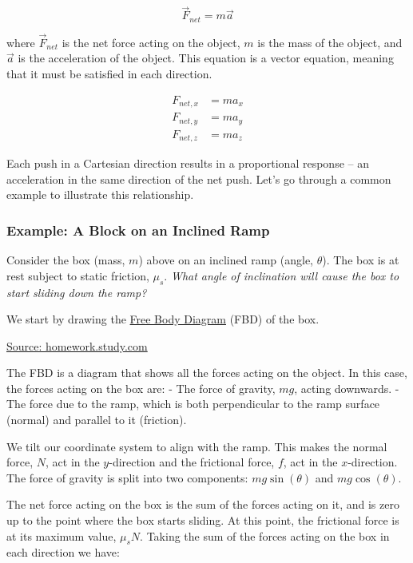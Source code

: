 \[\vec{F}_{net} = m\vec{a}\]

where \(\vec{F}_{net}\) is the net force acting on the object, \(m\) is
the mass of the object, and \(\vec{a}\) is the acceleration of the
object. This equation is a vector equation, meaning that it must be
satisfied in each direction.

\[\begin{aligned}
F_{net,x} &= m a_x \\
F_{net,y} &= m a_y \\
F_{net,z} &= m a_z
\end{aligned}\]

Each push in a Cartesian direction results in a proportional response --
an acceleration in the same direction of the net push. Let's go through
a common example to illustrate this relationship.

\subsubsection{Example: A Block on an Inclined
Ramp}\label{example-a-block-on-an-inclined-ramp}

Consider the box (mass, \(m\)) above on an inclined ramp (angle,
\(\theta\)). The box is at rest subject to static friction, \(\mu_s\).
\emph{What angle of inclination will cause the box to start sliding down
the ramp?}

We start by drawing the
\href{https://en.wikipedia.org/wiki/Free_body_diagram}{Free Body
Diagram} (FBD) of the box.

\href{images/notes/week1/diagram_2_450x3002352212273710292.png}{Source:
homework.study.com}

The FBD is a diagram that shows all the forces acting on the object. In
this case, the forces acting on the box are: - The force of gravity,
\(mg\), acting downwards. - The force due to the ramp, which is both
perpendicular to the ramp surface (normal) and parallel to it
(friction).

We tilt our coordinate system to align with the ramp. This makes the
normal force, \(N\), act in the \(y\)-direction and the frictional
force, \(f\), act in the \(x\)-direction. The force of gravity is split
into two components: \(mg\sin(\theta)\) and \(mg\cos(\theta)\).

The net force acting on the box is the sum of the forces acting on it,
and is zero up to the point where the box starts sliding. At this point,
the frictional force is at its maximum value, \(\mu_s N\). Taking the
sum of the forces acting on the box in each direction we have:

